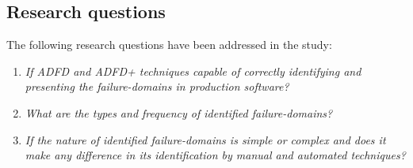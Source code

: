 \documentclass[runningheads,a4paper]{llncs}
\begin{document}
\subsection{Research questions} \label{sec:questions}
The following research questions have been addressed in the study:
\begin{enumerate}
%
\item \textit{If ADFD and ADFD+ techniques capable of correctly identifying and presenting the failure-domains in production software?} %

%
%
\item \textit{What are the types and frequency of identified failure-domains?} %
%
\item \textit{If the nature of identified failure-domains is simple or complex and does it make any difference in its identification by manual and automated techniques?}%

%


\end{enumerate}
\end{document}
